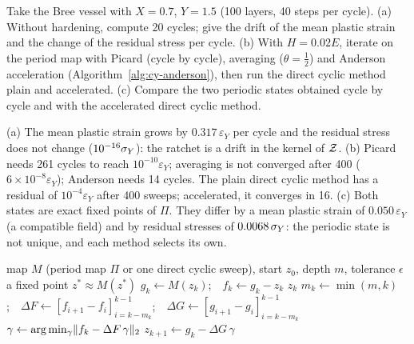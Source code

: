 \label{exo:cy-bree}
%
Take the Bree vessel with $X=0.7$, $Y=1.5$ (100 layers, 40 steps per cycle).
(a) Without hardening, compute 20 cycles; give the drift of the mean plastic
strain and the change of the residual stress per cycle. (b) With $H=0.02E$,
iterate on the period map with Picard (cycle by cycle), averaging
($\theta=\tfrac12$) and Anderson acceleration (Algorithm~\ref{alg:cy-anderson}),
then run the direct cyclic method plain and accelerated. (c) Compare the two
periodic states obtained cycle by cycle and with the accelerated direct cyclic
method.
\begin{solution}
(a) The mean plastic strain grows by $0.317\,\varepsilon_Y$ per cycle and the
residual stress does not change ($10^{-16}\sigma_{Y}$): the ratchet is a drift in the
kernel of $\mathcal{Z}$. (b) Picard needs 261 cycles to reach $10^{-10}\varepsilon_Y$;
averaging is not converged after 400 ($6\times10^{-8}\varepsilon_Y$); Anderson
needs 14 cycles. The plain direct cyclic method has a residual of
$10^{-4}\varepsilon_Y$ after 400 sweeps; accelerated, it converges in 16. (c)
Both states are exact fixed points of $\Pi$. They differ by a mean plastic
strain of $0.050\,\varepsilon_Y$ (a compatible field) and by residual stresses of
$0.0068\,\sigma_{Y}$: the periodic state is not unique, and each method selects its own.
\begin{algorithm}[H]
\caption{Anderson acceleration of a fixed-point map}\label{alg:cy-anderson}
\begin{algorithmic}[1]
\Require map $M$ (period map $\Pi$ or one direct cyclic sweep), start $z_0$, depth $m$, tolerance $\epsilon$
\Ensure a fixed point $z^\ast\approx M(z^\ast)$
  \State $g_k\gets M(z_k)$;\ \ $f_k\gets g_k-z_k$ 
   \Return $z_k$ \EndIf
  \State $m_k\gets\min(m,k)$;\ \ $\Delta F\gets[f_{i+1}-f_i]_{i=k-m_k}^{k-1}$;\ \ $\Delta G\gets[g_{i+1}-g_i]_{i=k-m_k}^{k-1}$
  \State $\gamma\gets\arg\min_\gamma\lVert f_k-\Delta F\,\gamma\rVert_2$ 
  \State $z_{k+1}\gets g_k-\Delta G\,\gamma$
\EndFor
\end{algorithmic}
\end{algorithm}

\end{solution}

